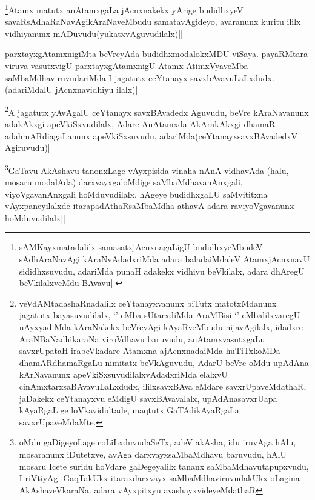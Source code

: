
\begin{artha}
\footnote{sAMKayxmatadalilx samasatxjAcnxnagaLigU budidhxyeMbudeV sAdhAraNavAgi kAraNvAdadxriMda adara baladaiMdaleV AtamxjAcnxnavU sididhxsuvudu, adariMda punaH adakekx vidhiyu beVkilalx, adara dhAregU beVkilalxveMdu BAvavu||}Atamx matutx anAtamxgaLa jAcnxnakekx yArige budidhxyeV savaRsAdhaRaNavAgikAraNaveMbudu samatavAgideyo, avaranunx kuritu ililx vidhiyanunx mADuvudu(yukatxvAguvudilalx)||
\end{artha}


\begin{artha}
parxtayxgAtamxnigiMta beVreyAda budidhxmodalokxMDU viSaya. payaRMtara viruva vasutxvigU parxtayxgAtamxnigU Atamx AtimxVyaveMba saMbaMdhaviruvudariMda I jagatutx ceYtanayx savxbAvavuLaLxdudx.(adariMdalU jAcnxnavidhiyu ilalx)||
\end{artha}


\begin{artha}
\footnote{veVdAMtadashaRnadalilx ceYtanayxvanunx biTutx matotxMdanunx jagatutx bayasuvudilalx, `\stext' eMba sUtarxdiMda AraMBisi `\stext' eMbalilxvaregU nAyxyadiMda kAraNakekx beVreyAgi kAyaRveMbudu nijavAgilalx, idadxre AraNBaNadhikaraNa viroVdhavu baruvudu, anAtamxvasutxgaLu savxrUpataH irabeVkadare Atamxna ajAcnxnadaiMda huTiTxkoMDa dhamARdhamaRgaLu nimitatx beVkAguvudu, AdarU beVre oMdu upAdAna kArNavanunx apeVkiSxsuvudilalxvAdadxriMda elalxvU cinAmxtarxsaBAvavuLaLxdudx, ililxsavxBAva eMdare savxrUpaveMdathaR, jaDakekx ceYtanayxvu eMdigU savxBAvavalalx, upAdAnasavxrUapa kAyaRgaLige loVkavididtade, maqtutx GaTAdikAyaRgaLa savxrUpaveMdaMte.}A jagatutx yAvAgalU ceYtanayx savxBAvadedx Aguvudu, beVre kAraNavanunx adakAkxgi apeVkiSxvudilalx, Adare AnAtamxda AkArakAkxgi dhamaR adahmARdiagaLanunx apeVkiSxsuvudu, adariMda(ceYtanayxsavxBAvadedxV Agiruvudu)||
\end{artha}


\begin{artha}
\footnote{oMdu gaDigeyoLage coLiLxduvudaSeTx, adeV akAsha, idu iruvAga hAlu, mosaranunx iDutetxve, avAga darxvayxsaMbaMdhavu baruvudu, hAlU mosaru Icete suridu hoVdare gaDegeyalilx tananx saMbaMdhavutapupxvudu, I riVtiyAgi GaqTakUkx itaraxdarxvayx saMbaMdhaviruvudakUkx oLagina AkAshaveVkaraNa. adara vAyxpitxyu avashayxvideyeMdathaR}GaTavu AkAshavu tanonxLage vAyxpisida vinaha nAnA vidhavAda (halu, mosaru modalAda) darxvayxgaloMdige saMbaMdhavanAnxgali, viyoVgavanAnxgali hoMduvudilalx, hAgeye budidhxgaLU saMvititxna vAyxpaneyilalxde itarapadAthaRsaMbaMdha athavA adara raviyoVgavanunx hoMduvudilalx||
\end{artha}

